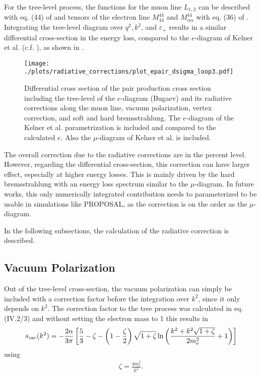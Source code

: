 For the tree-level process, the functions for the muon line $L_{1,2}$ can be described with eq. (44) of \cite{Bugaev77}
and tensors of the electron line $M_{44}^{44}$ and $M_{\alpha \alpha}^{44}$ with eq. (36) of \cite{Bugaev77}.
Integrating the tree-level diagram over $q^2, k^2$, and $\varepsilon_+$ results in a similar differential cross-section in the energy loss, compared to the $e$-diagram of Kelner et al. (c.f. ), as shown in .
\begin{figure}
    \centering
    \texttt{[image: ./plots/radiative\_corrections/plot\_epair\_dsigma\_loop3.pdf]}
    \caption{Differential cross section of the pair production cross section including the tree-level of the $e$-diagram (Bugaev) and its radiative corrections along the muon line, vacuum polarization, vertex correction, and soft and hard bremsstrahlung. The $e$-diagram of the Kelner et al. parametrization is included and compared to the calculated $e$.
    Also the $\mu$-diagram of Kelner et al. is included.}
    \label{fig:epair_all_compare}
\end{figure}

The overall correction due to the radiative corrections are in the percent level. However, regarding the differential cross-section, this correction can have larger effect, especially at higher energy losses.
This is mainly driven by the hard bremsstrahlung with an energy loss spectrum similar to the $\mu$-diagram.
In future works, this only numerically integrated contribution needs to parameterized to be usable in simulations like PROPOSAL, as the correction is on the order as the $\mu$-diagram.

In the following subsections, the calculation of the radiative correction is described.

\subsection{Vacuum Polarization}

Out of the tree-level cross-section, the vacuum polarization can simply be included with a correction factor before the integration over $k^2$, since it only depends on $k^2$.
The correction factor to the tree process was calculated in \cite{Mork65} eq. (IV.2/3) and without setting the electron mass to 1 this results in
\begin{align}
s_{\mathrm{vac}}(k^2) = -\frac{2 \alpha}{3 \pi}
        \left[ \frac53 - \zeta - \left( 1-\frac{\zeta}{2} \right) \sqrt{1+\zeta} 
        \operatorname{ln} \left( \frac{k^2 + k^2 \sqrt{1 + \zeta}}{2m_e^2} + 1 \right) \right]
\end{align}
using
\begin{align}
    \zeta = \frac{4 m_e^2}{k^2} .
\end{align}

